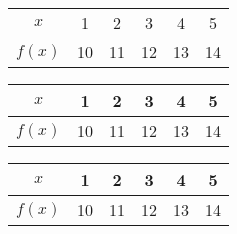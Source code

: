\documentclass[11pt]{article}
\begin{document}
\begin{tabular}{cccccc}

$x$ & 1 & 2 & 3 & 4 & 5 \\
$f(x)$ & 10 & 11 & 12 & 13 & 14 \\

\end{tabular}

\begin{tabular}{cccccc}

$x$ & 1 & 2 & 3 & 4 & 5 \\ \hline
$f(x)$ & 10 & 11 & 12 & 13 & 14 \\

\end{tabular}

\begin{tabular}{|c|c|c|c|c|c|}

\hline
$x$ & 1 & 2 & 3 & 4 & 5 \\ \hline
$f(x)$ & 10 & 11 & 12 & 13 & 14 \\ \hline

\end{tabular}
\end{document}
